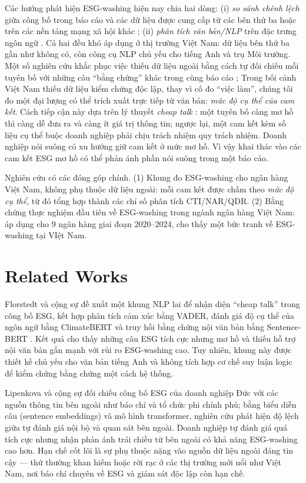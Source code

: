 \documentclass[runningheads]{llncs}
\begin{document}
Các hướng phát hiện ESG-washing hiện nay chia hai dòng: (i) \emph{so sánh chênh lệch} giữa công bố trong báo cáo và các dữ liệu được cung cấp từ các bên thứ ba hoặc trên các nền tảng mạng xã hội khác \cite{su16062571,ghitti2024agency,kathan2025you}; (ii) \emph{phân tích văn bản/NLP} trên đặc trưng ngôn ngữ \cite{lagasio2024esg,lipenkova2023detecting,bingler2022cheap}. Cả hai đều khó áp dụng ở thị trường Việt Nam: dữ liệu bên thứ ba gần như không có, còn công cụ NLP chủ yếu cho tiếng Anh và trụ Môi trường. Một số nghiên cứu khắc phục việc thiếu dữ liệu ngoài bằng cách tự đối chiếu mỗi tuyên bố với những câu ``bằng chứng'' khác trong cùng báo cáo \cite{florstedt2025detecting}; Trong bối cảnh Việt Nam thiếu dữ liệu kiểm chứng độc lập, thay vì cố đo ``việc làm'', chúng tôi đo một đại lượng có thể trích xuất trực tiếp từ văn bản: \emph{mức độ cụ thể của cam kết}. Cách tiếp cận này dựa trên lý thuyết \emph{cheap talk} \cite{farrell1996cheap}: một tuyên bố càng mơ hồ thì càng dễ đưa ra và càng ít giá trị thông tin; ngược lại, một cam kết kèm số liệu cụ thể buộc doanh nghiệp phải chịu trách nhiệm quy trách nhiệm. Doanh nghiệp nói suông có xu hướng giữ cam kết ở mức mơ hồ. Vì vậy khai thác vào các cam kết ESG mơ hồ có thể phản ánh phần nói suông trong một báo cáo.

Nghiên cứu có các đóng góp chính. (1) Khung đo ESG-washing cho ngân hàng Việt Nam, không phụ thuộc dữ liệu ngoài: mỗi cam kết được chấm theo \emph{mức độ cụ thể}, từ đó tổng hợp thành các chỉ số phân tích CTI/NAR/QDR. (2) Bằng chứng thực nghiệm đầu tiên về ESG-washing trong ngành ngân hàng Việt Nam: áp dụng cho 9 ngân hàng giai đoạn 2020--2024, cho thấy một bức tranh về ESG-washing tại VIệt Nam.

\section{Related Works}
Florstedt và cộng sự \cite{florstedt2025detecting} đề xuất một khung NLP lai để nhận diện ``cheap talk'' trong công bố ESG, kết hợp phân tích cảm xúc bằng VADER, đánh giá độ cụ thể của ngôn ngữ bằng ClimateBERT \cite{webersinke2021climatebert} và truy hồi bằng chứng nội văn bản bằng Sentence-BERT \cite{reimers2019sentence}. Kết quả cho thấy những câu ESG tích cực nhưng mơ hồ và thiếu hỗ trợ nội văn bản gắn mạnh với rủi ro ESG-washing cao. Tuy nhiên, khung này được thiết kế chủ yếu cho văn bản tiếng Anh và không tích hợp cơ chế suy luận logic để kiểm chứng bằng chứng một cách hệ thống.

Lipenkova và cộng sự \cite{lipenkova2023detecting} đối chiếu công bố ESG của doanh nghiệp Đức với các nguồn thông tin bên ngoài như báo chí và tổ chức phi chính phủ; bằng biểu diễn câu (sentence embeddings) và mô hình transformer, nghiên cứu phát hiện độ lệch giữa tự đánh giá nội bộ và quan sát bên ngoài. Doanh nghiệp tự đánh giá quá tích cực nhưng nhận phản ánh trái chiều từ bên ngoài có khả năng ESG-washing cao hơn. Hạn chế cốt lõi là sự phụ thuộc nặng vào nguồn dữ liệu ngoài đáng tin cậy --- thứ thường khan hiếm hoặc rời rạc ở các thị trường mới nổi như Việt Nam, nơi báo chí chuyên về ESG và giám sát độc lập còn hạn chế.
\end{document}
